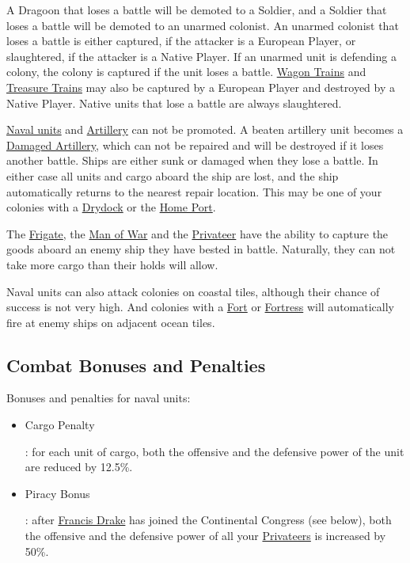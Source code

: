 \documentclass[12pt]{book}
\begin{document}
A Dragoon that loses a battle will be demoted to a Soldier, and a
Soldier that loses a battle will be demoted to an unarmed colonist. An
unarmed colonist that loses a battle is either captured, if the
attacker is a European Player, or slaughtered, if the attacker is a
Native Player. If an unarmed unit is defending a colony, the colony
is captured if the unit loses a battle. \hyperlink{Wagon Train}{Wagon
  Trains} and \hyperlink{Treasure Train}{Treasure Trains} may also be
captured by a European Player and destroyed by a Native Player. Native
units that lose a battle are always slaughtered.

\hyperlink{Naval Units}{Naval units} and
\hyperlink{Artillery}{Artillery} can not be promoted. A beaten
artillery unit becomes a \hyperlink{Damaged Artillery}{Damaged
Artillery}, which can not be repaired and will be destroyed if it
loses another battle. Ships are either sunk or damaged when they lose
a battle. In either case all units and cargo aboard the ship are lost,
and the ship automatically returns to the nearest repair
location. This may be one of your colonies with a
\hyperlink{Drydock}{Drydock} or the \hyperlink{Home Port}{Home Port}.

The \hyperlink{Frigate}{Frigate}, the \hyperlink{Man of War}{Man of
War} and the \hyperlink{Privateer}{Privateer} have the ability to
capture the goods aboard an enemy ship they have bested in
battle. Naturally, they can not take more cargo than their holds will
allow.

Naval units can also attack colonies on coastal tiles, although their
chance of success is not very high. And colonies with a
\hyperlink{Fort}{Fort} or \hyperlink{Fortress}{Fortress} will
automatically fire at enemy ships on adjacent ocean tiles.


\hypertarget{combat bonuses}{\subsection{Combat Bonuses and Penalties}}

Bonuses and penalties for naval units:

\begin{itemize}
\item \hypertarget{Cargo Penalty}{Cargo Penalty}: for each unit of
  cargo, both the offensive and the defensive power of the unit are
  reduced by 12.5\%.
\item \hypertarget{Piracy Bonus}{Piracy Bonus}: after
  \hyperlink{Francis Drake}{Francis Drake} has joined the Continental
  Congress (see below), both the offensive and the defensive power of
  all your \hyperlink{Privateer}{Privateers} is increased by 50\%.
\end{itemize}
\end{document}
